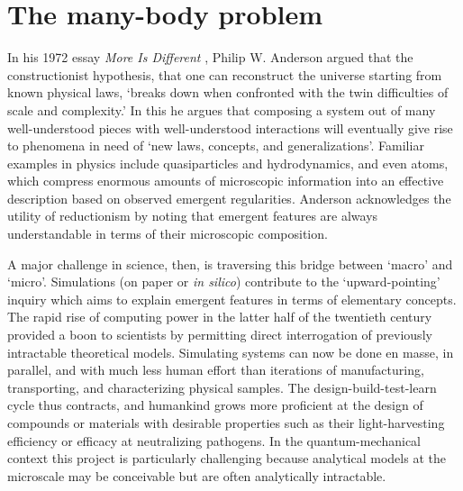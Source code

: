 
\section{The many-body problem}


	In his 1972 essay \emph{More Is Different} \cite{Anderson72},  Philip W. Anderson argued that the constructionist hypothesis, that one can reconstruct the universe starting from known physical laws,  `breaks down when confronted with the twin difficulties of scale and complexity.' 
	In this he argues that composing a system out of many well-understood pieces with well-understood interactions will eventually give rise to  phenomena in need of `new laws, concepts, and generalizations'.
	Familiar examples in physics include quasiparticles and hydrodynamics, and even atoms, which compress enormous amounts of microscopic information into an effective description based on observed emergent regularities.
	Anderson acknowledges the utility of reductionism by noting that emergent features are always understandable in terms of their microscopic composition.

	A major challenge in science, then, is traversing this bridge between `macro' and `micro'.
	Simulations (on paper or \emph{in silico}) contribute to the `upward-pointing' inquiry which aims to explain emergent features in terms of elementary concepts.
	The rapid rise of computing power in the latter half of the twentieth century provided a boon to scientists by permitting direct interrogation of previously intractable theoretical models.
	Simulating systems can now be done en masse, in parallel, and with much less human effort than iterations of manufacturing, transporting, and characterizing physical samples.
	The design-build-test-learn cycle thus contracts, and humankind grows more proficient at the design of compounds or materials with desirable properties such as their light-harvesting efficiency or efficacy at neutralizing pathogens.
	In the quantum-mechanical context this project is particularly challenging because analytical models at the microscale may be conceivable but are often analytically intractable.
	




